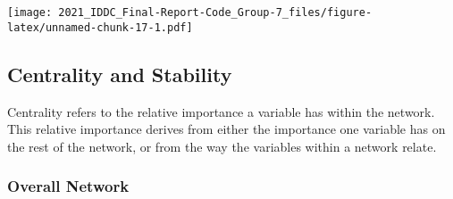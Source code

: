 \documentclass[
]{article}
\newenvironment{Shaded}{\begin{snugshade}}{\end{snugshade}}
\newcommand{\CommentTok}[1]{\textcolor[rgb]{0.56,0.35,0.01}{\textit{#1}}}
\newcommand{\DataTypeTok}[1]{\textcolor[rgb]{0.13,0.29,0.53}{#1}}
\newcommand{\DecValTok}[1]{\textcolor[rgb]{0.00,0.00,0.81}{#1}}
\newcommand{\KeywordTok}[1]{\textcolor[rgb]{0.13,0.29,0.53}{\textbf{#1}}}
\newcommand{\NormalTok}[1]{#1}
\newcommand{\OperatorTok}[1]{\textcolor[rgb]{0.81,0.36,0.00}{\textbf{#1}}}
\newcommand{\StringTok}[1]{\textcolor[rgb]{0.31,0.60,0.02}{#1}}
\begin{document}
\begin{Shaded}
\end{Shaded}

\texttt{[image: 2021\_IDDC\_Final-Report-Code\_Group-7\_files/figure-latex/unnamed-chunk-17-1.pdf]}

\hypertarget{centrality-and-stability}{%
\subsection{Centrality and Stability}\label{centrality-and-stability}}

Centrality refers to the relative importance a variable has within the
network. This relative importance derives from either the importance one
variable has on the rest of the network, or from the way the variables
within a network relate.

\hypertarget{overall-network-1}{%
\subsubsection{Overall Network}\label{overall-network-1}}
\end{document}
